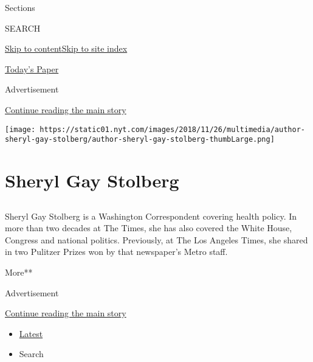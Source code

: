 Sections

SEARCH

\protect\hyperlink{site-content}{Skip to
content}\protect\hyperlink{site-index}{Skip to site index}

\href{https://myaccount.nytimes.com/auth/login?response_type=cookie\&client_id=vi}{}

\href{https://www.nytimes.com/section/todayspaper}{Today's Paper}

Advertisement

\protect\hyperlink{after-top}{Continue reading the main story}

\texttt{[image: https://static01.nyt.com/images/2018/11/26/multimedia/author-sheryl-gay-stolberg/author-sheryl-gay-stolberg-thumbLarge.png]}

\hypertarget{sheryl-gay-stolberg}{%
\section{Sheryl Gay Stolberg}\label{sheryl-gay-stolberg}}

\subsection{}

Sheryl Gay Stolberg is a Washington Correspondent covering health
policy. In more than two decades at The Times, she has also covered the
White House, Congress and national politics. Previously, at The Los
Angeles Times, she shared in two Pulitzer Prizes won by that newspaper's
Metro staff.

More**

Advertisement

\protect\hyperlink{after-mid1}{Continue reading the main story}

\begin{itemize}
\tightlist
\item
  \protect\hyperlink{stream-panel}{Latest}
\item
  Search
\end{itemize}

